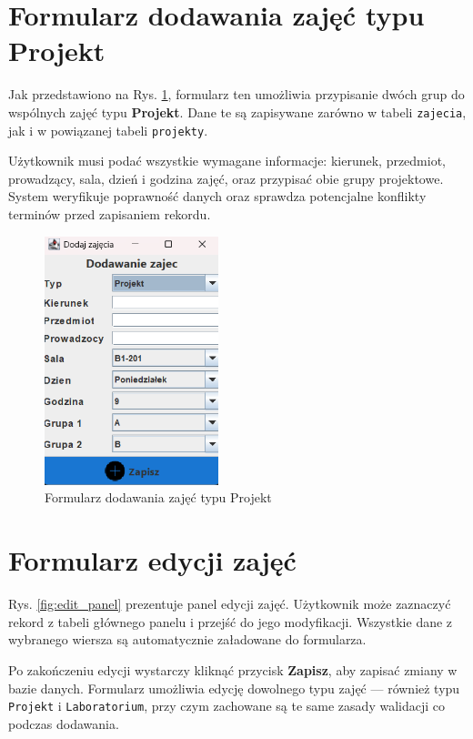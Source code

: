 \clearpage

\section*{Formularz dodawania zajęć typu Projekt}

Jak przedstawiono na Rys. \ref{fig:add_projekt}, formularz ten umożliwia przypisanie dwóch grup do wspólnych zajęć typu \textbf{Projekt}. Dane te są zapisywane zarówno w tabeli \texttt{zajecia}, jak i w powiązanej tabeli \texttt{projekty}.

Użytkownik musi podać wszystkie wymagane informacje: kierunek, przedmiot, prowadzący, sala, dzień i godzina zajęć, oraz przypisać obie grupy projektowe. System weryfikuje poprawność danych oraz sprawdza potencjalne konflikty terminów przed zapisaniem rekordu.

\begin{figure}[H]
\centering
\includegraphics[width=0.45\textwidth]{figures/workApl/add_projekt_panel.png}
\caption{Formularz dodawania zajęć typu Projekt}
\label{fig:add_projekt}
\end{figure}

\clearpage

\section*{Formularz edycji zajęć}

Rys. \ref{fig:edit_panel} prezentuje panel edycji zajęć. Użytkownik może zaznaczyć rekord z tabeli głównego panelu i przejść do jego modyfikacji. Wszystkie dane z wybranego wiersza są automatycznie załadowane do formularza.

Po zakończeniu edycji wystarczy kliknąć przycisk \textbf{Zapisz}, aby zapisać zmiany w bazie danych. Formularz umożliwia edycję dowolnego typu zajęć — również typu \texttt{Projekt} i \texttt{Laboratorium}, przy czym zachowane są te same zasady walidacji co podczas dodawania.

